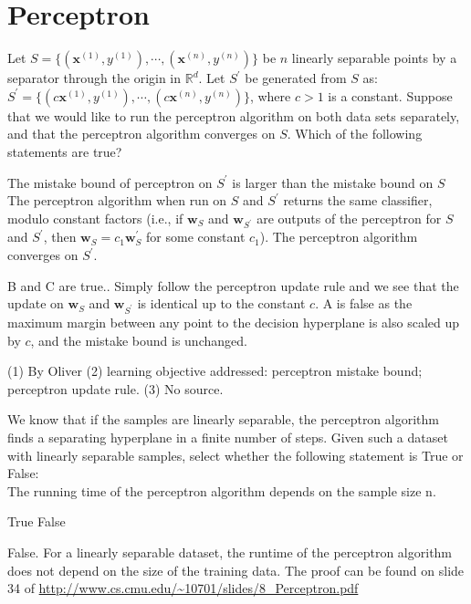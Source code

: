 \begin{questions}
\end{questions}

\section{Perceptron}
\begin{questions}
 Let $S = \{(\mathbf{x}^{(1)},y^{(1)}),\cdots,(\mathbf{x}^{(n)},y^{(n)})\}$ be $n$ linearly separable points by a separator through the origin in $\mathbb{R}^d$. Let $S^\prime$ be generated from $S$ as: $S^\prime = \{(c\mathbf{x}^{(1)},y^{(1)}),\cdots,(c\mathbf{x}^{(n)},y^{(n)})\}$, where $c > 1$ is a constant. Suppose that we would like to run the perceptron algorithm on both data sets separately, and that the perceptron algorithm converges on $S$. Which of the following statements are true?

    {%
    \checkboxchar{$\Box$} %
    \begin{checkboxes}
     \choice The mistake bound of perceptron on $S^\prime$ is larger than the mistake bound on $S$
     \choice The perceptron algorithm when run on $S$ and $S^\prime$ returns the same classifier, modulo constant factors (i.e., if $\mathbf{w}_S$ and $\mathbf{w}_{S^\prime}$ are outputs of the perceptron for $S$ and $S^\prime$, then $\mathbf{w}_S = c_1 \mathbf{w}_S^\prime$ for some constant $c_1$).
     \choice The perceptron algorithm converges on $S^\prime$.
    \end{checkboxes}
    }
    \begin{soln}
    B and C are true.. Simply follow the perceptron update rule and we see that the update on $\mathbf{w}_S$ and $\mathbf{w}_{S^\prime}$ is identical up to the constant $c$. A is false as the maximum margin between any point to the decision hyperplane is also scaled up by $c$, and the mistake bound is unchanged.
    \end{soln}
    
    \begin{qauthor}
    (1) By Oliver
    (2) learning objective addressed: perceptron mistake bound; perceptron update rule.
    (3) No source.
    \end{qauthor}
    
 We know that if the samples are linearly separable, the perceptron algorithm finds a separating hyperplane in a finite number of steps. Given such a dataset with linearly separable samples, select whether the following statement is True or False:\\
The running time of the perceptron algorithm depends on the sample size n.
    \begin{checkboxes}
     \choice True 
     \choice False
    \end{checkboxes}
    \begin{soln}
    False. For a linearly separable dataset, the runtime of the perceptron algorithm does not depend on the size of the training data. The proof can be found on slide 34 of  \url{http://www.cs.cmu.edu/~10701/slides/8_Perceptron.pdf}
    \end{soln}
    

\end{questions}
